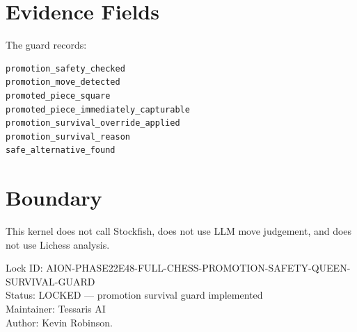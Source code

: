 \documentclass[11pt,a4paper]{article}
\begin{document}
\section{Evidence Fields}

The guard records:

\begin{verbatim}
promotion_safety_checked
promotion_move_detected
promoted_piece_square
promoted_piece_immediately_capturable
promotion_survival_override_applied
promotion_survival_reason
safe_alternative_found
\end{verbatim}

\section{Boundary}

This kernel does not call Stockfish, does not use LLM move judgement, and does not use Lichess analysis.

\bigskip

\noindent
Lock ID: AION-PHASE22E48-FULL-CHESS-PROMOTION-SAFETY-QUEEN-SURVIVAL-GUARD\\
Status: LOCKED --- promotion survival guard implemented\\
Maintainer: Tessaris AI\\
Author: Kevin Robinson.
\end{document}
